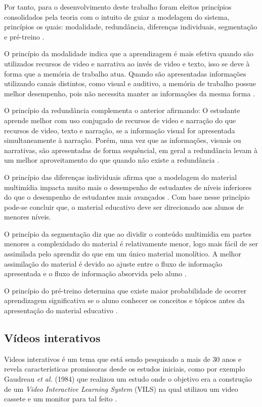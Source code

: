 Por tanto, para o desenvolvimento deste trabalho foram eleitos princípios consolidados pela teoria com o intuito de guiar a modelagem do sistema, princípios os quais: modalidade, redundância, diferenças individuais, segmentação e pré-treino \cite{clark2011, mayer2001, moreno2000}.

O princípio da modalidade indica que a aprendizagem é mais efetiva quando são utilizados recursos de video e narrativa ao invés de video e texto, isso se deve à forma que a memória de trabalho atua. Quando são apresentadas informações utilizando canais distintos, como visual e auditivo, a memória de trabalho possue melhor desempenho, pois não necessita manter as informações da mesma forma \cite{mayer2001}. 

O princípio da redundância complementa o anterior afirmando: O estudante aprende melhor com uso conjugado de recursos de video e narração do que recursos de video, texto e narração, se a informação visual for apresentada simultaneamente à narração. Porém, uma vez que as informações, visuais ou narrativas, são apresentadas de forma sequêncial, em geral a redundância levam à um melhor aproveitamento do que quando não existe a redundância \cite{moreno2000}.

O  princípio  das  diferenças  individuais  afirma  que  a  modelagem  do  material multimídia impacta muito mais o desempenho de estudantes de níveis inferiores do que o desempenho de estudantes mais avançados \cite{mayer2001}. Com base nesse princípio pode-se concluir que, o material educativo deve ser direcionado aos alunos de menores níveis.

O princípio da segmentação diz que ao dividir o conteúdo multimídia em partes menores a complexidado do material é relativamente menor, logo mais fácil de ser assimilada pelo aprendiz do que em um único material monolítico. A melhor assimilação do material é devido ao ajuste entre o fluxo de informação apresentada e o fluxo de informação absorvida pelo aluno \cite{mayer2001, moreno2000}.

O princípio do pré-treino determina que existe maior probabilidade de ocorrer aprendizagem significativa se o aluno conhecer os conceitos e tópicos antes da apresentação do material educativo \cite{mayer2001, moreno2000}.

\subsection{Vídeos interativos}

Videos interativos é um tema que está sendo pesquisado a mais de 30 anos e revela características promissoras desde os estudos iniciais, como por exemplo Gaudreau \textit{et al.} (1984) que realizou um estudo onde o objetivo era a construção de um \textit{Video Interactive Learning System} (VILS) na qual utilizou um video cassete e um monitor para tal feito \cite{gaudreau1984}.

